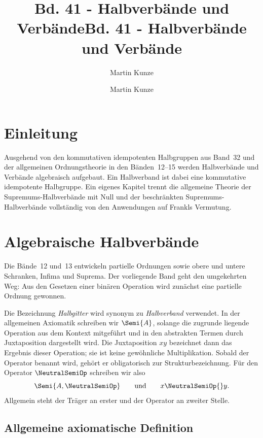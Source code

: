 \documentclass[main.tex]{subfiles}
\title{Bd. 41 - Halbverbände und Verbände}
\author{Martin Kunze}
\date{}
\begin{document}
\title{Bd. 41 - Halbverbände und Verbände}
\author{Martin Kunze}
\date{}
\hypersetup{pageanchor=false}
\maketitle
\hypersetup{pageanchor=true}
\setcounter{tocdepth}{3}
\tableofcontents
\setcounter{file}{41}
\renewcommand{\FormulaBandID}{41}
\newcommand{\ProofRefStack}[1]{%
  \ensuremath{\begin{gathered}#1\end{gathered}}}

\chapter{Einleitung}

Ausgehend von den kommutativen idempotenten Halbgruppen aus Band~32 und der allgemeinen Ordnungstheorie
in den Bänden~12--15 werden Halbverbände und Verbände algebraisch aufgebaut. Ein
Halbverband ist dabei eine kommutative idempotente Halbgruppe. Ein eigenes
Kapitel trennt
die allgemeine Theorie der Supremums-Halbverbände mit Null und der
beschränkten Supremums-Halbverbände vollständig von den Anwendungen auf
Frankls Vermutung.

\chapter{Algebraische Halbverbände}

Die Bände~12 und~13 entwickeln partielle Ordnungen sowie obere und untere Schranken,
Infima und Suprema. Der vorliegende Band geht den umgekehrten Weg: Aus den
Gesetzen einer binären Operation wird zunächst eine partielle Ordnung
gewonnen.

Die Bezeichnung \emph{Halbgitter} wird synonym zu \emph{Halbverband}
verwendet. In der allgemeinen Axiomatik schreiben wir \(\Semi{A}\), solange
die zugrunde liegende Operation aus dem Kontext mitgeführt und in den
abstrakten Termen durch Juxtaposition dargestellt wird. Die Juxtaposition
\(xy\) bezeichnet dann das Ergebnis dieser Operation; sie ist keine
gewöhnliche Multiplikation. Sobald der Operator benannt wird, gehört er
obligatorisch zur Strukturbezeichnung. Für den Operator \(\NeutralSemiOp\)
schreiben wir also
\[
  \Semi{A,\NeutralSemiOp}
  \qquad\text{und}\qquad
  x\NeutralSemiOp{}y.
\]
Allgemein steht der Träger an erster und der Operator an zweiter Stelle.

\section{Allgemeine axiomatische Definition}
\end{document}

